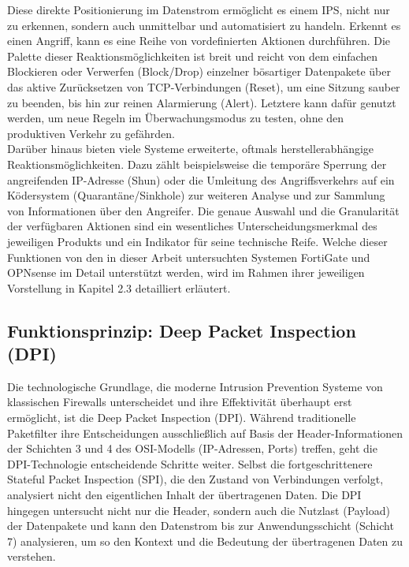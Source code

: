 Diese direkte Positionierung im Datenstrom ermöglicht es einem IPS, nicht nur zu erkennen, sondern auch unmittelbar und automatisiert zu handeln. Erkennt es einen Angriff, kann es eine Reihe von vordefinierten Aktionen durchführen. Die Palette dieser Reaktionsmöglichkeiten ist breit und reicht von dem einfachen Blockieren oder Verwerfen (Block/Drop) einzelner bösartiger Datenpakete über das aktive Zurücksetzen von TCP-Verbindungen (Reset), um eine Sitzung sauber zu beenden, bis hin zur reinen Alarmierung (Alert). Letztere kann dafür genutzt werden, um neue Regeln im Überwachungsmodus zu testen, ohne den produktiven Verkehr zu gefährden. \cite{Suricata1, NIST1}\\

Darüber hinaus bieten viele Systeme erweiterte, oftmals herstellerabhängige Reaktionsmöglichkeiten. Dazu zählt beispielsweise die temporäre Sperrung der angreifenden IP-Adresse (Shun) oder die Umleitung des Angriffsverkehrs auf ein Ködersystem (Quarantäne/Sinkhole) zur weiteren Analyse und zur Sammlung von Informationen über den Angreifer. Die genaue Auswahl und die Granularität der verfügbaren Aktionen sind ein wesentliches Unterscheidungsmerkmal des jeweiligen Produkts und ein Indikator für seine technische Reife. Welche dieser Funktionen von den in dieser Arbeit untersuchten Systemen FortiGate und OPNsense im Detail unterstützt werden, wird im Rahmen ihrer jeweiligen Vorstellung in Kapitel 2.3 detailliert erläutert.
\newpage
\subsection{Funktionsprinzip: Deep Packet Inspection (DPI)}
Die technologische Grundlage, die moderne Intrusion Prevention Systeme von klassischen Firewalls unterscheidet und ihre Effektivität überhaupt erst ermöglicht, ist die Deep Packet Inspection (DPI). Während traditionelle Paketfilter ihre Entscheidungen ausschließlich auf Basis der Header-Informationen der Schichten 3 und 4 des OSI-Modells (IP-Adressen, Ports) treffen, geht die DPI-Technologie entscheidende Schritte weiter. Selbst die fortgeschrittenere Stateful Packet Inspection (SPI), die den Zustand von Verbindungen verfolgt, analysiert nicht den eigentlichen Inhalt der übertragenen Daten. Die DPI hingegen untersucht nicht nur die Header, sondern auch die Nutzlast (Payload) der Datenpakete und kann den Datenstrom bis zur Anwendungsschicht (Schicht 7) analysieren, um so den Kontext und die Bedeutung der übertragenen Daten zu verstehen.\\


